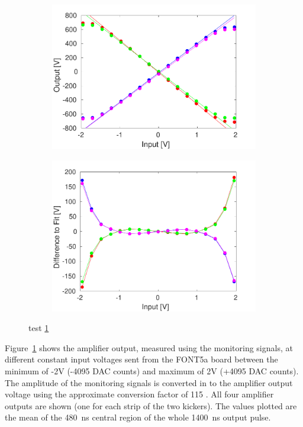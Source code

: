 \documentclass[%
 reprint,
 superscriptaddress,
 amsmath,
 amssymb,
 prstab,
]{revtex4-1}
\begin{document}
\begin{figure}
	\begin{subfigure}{\columnwidth}
		\includegraphics[width=\textwidth]{figs/hw/AmpOutvsDAC}
		\caption{}
		\label{f:AmpOutvsDAC}
	\end{subfigure}

	\begin{subfigure}{\columnwidth}
		\includegraphics[width=\textwidth]{figs/hw/AmpOutvsDAC_residual}
		\caption{}
		\label{f:AmpOutvsDAC_residual}
	\end{subfigure}	
	\caption{\label{f:AmpOutvsDACFig}test \ref{f:AmpOutvsDAC}}
\end{figure}

Figure~\ref{f:AmpOutvsDAC} shows the amplifier output, measured using the 
monitoring signals, at different constant input voltages sent from the FONT5a 
board between the minimum of -2V (-4095 DAC counts) and maximum of 2V (+4095 
DAC counts). The amplitude of the monitoring signals is converted in to the 
amplifier output voltage using the approximate conversion factor of 115 
\cite{colinPriv}. All four amplifier outputs are shown (one for each strip of 
the two kickers). The values plotted are the mean of the 480~ns central region 
of the whole 1400~ns output pulse.
\end{document}
